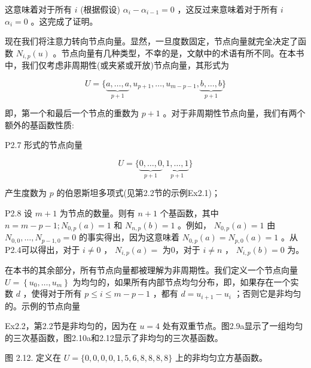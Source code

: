 \documentclass[../main.tex]{subfiles}
\begin{document}
这意味着对于所有 \(i\) (根据假设) \({\alpha }_{i} - {\alpha }_{i - 1} = 0\) ，这反过来意味着对于所有 \(i\)  \({\alpha }_{i} = 0\) 。这完成了证明。

现在我们将注意力转向节点向量。显然，一旦度数固定，节点向量就完全决定了函数 \({N}_{i,p}\left( u\right)\) 。节点向量有几种类型，不幸的是，文献中的术语有所不同。在本书中，我们仅考虑非周期性(或夹紧或开放)节点向量，其形式为

\[
U = \{ \underset{p + 1}{\underbrace{a,\ldots ,a}},{u}_{p + 1},\ldots ,{u}_{m - p - 1},\underset{p + 1}{\underbrace{b,\ldots ,b}}\}  \tag{2.13}
\]

即，第一个和最后一个节点的重数为 \(p + 1\) 。对于非周期性节点向量，我们有两个额外的基函数性质:

P2.7 形式的节点向量

\[
U = \{ \underset{p + 1}{\underbrace{0,\ldots ,0}},\underset{p + 1}{\underbrace{1,\ldots ,1}}\}
\]

产生度数为 \(p\) 的伯恩斯坦多项式(见第2.2节的示例Ex2.1)；

P2.8 设 \(m + 1\) 为节点的数量。则有 \(n + 1\) 个基函数，其中 \(n = m - p - 1;{N}_{0,p}\left( a\right)  = 1\) 和 \({N}_{n,p}\left( b\right)  = 1\) 。例如， \({N}_{0,p}\left( a\right)  = 1\) 由 \({N}_{0,0},\ldots ,{N}_{p - 1,0} = 0\) 的事实得出，因为这意味着 \({N}_{0,p}\left( a\right)  = {N}_{p,0}\left( a\right)  = 1\) 。从P2.4可以得出，对于 \(i \neq  0\) ， \({N}_{i,p}\left( a\right)  =\) 为0，对于 \(i \neq  n\) ， \({N}_{i,p}\left( b\right)  = 0\) 为。

在本书的其余部分，所有节点向量都被理解为非周期性。我们定义一个节点向量 \(U = \left\{  {{u}_{0},\ldots ,{u}_{m}}\right\}\) 为均匀的，如果所有内部节点均匀分布，即，如果存在一个实数 \(d\) ，使得对于所有 \(p \leq  i \leq  m - p - 1\) ，都有 \(d = {u}_{i + 1} - {u}_{i}\) ；否则它是非均匀的。示例的节点向量

Ex2.2，第2.2节是非均匀的，因为在 \(u = 4\) 处有双重节点。图2.9a显示了一组均匀的三次基函数，图2.10a和2.12显示了非均匀的三次基函数。

\begin{center}
\begin{minipage}{18cm}
\vspace*{.6\baselineskip}
\centering
{}
\par\smallskip
图 2.12. 定义在 \(U = \{ 0,0,0,0,1,5,6,8,8,8,8\}\) 上的非均匀立方基函数。
\end{minipage}
\end{center}
\end{document}
